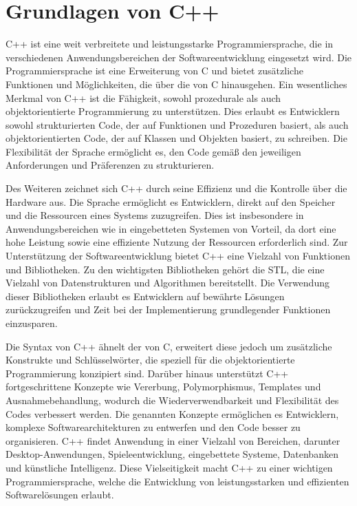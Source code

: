 \section{Grundlagen von C++}

C++ ist eine weit verbreitete und leistungsstarke Programmiersprache, die in verschiedenen Anwendungsbereichen der Softwareentwicklung eingesetzt wird. 
Die Programmiersprache ist eine Erweiterung von C und bietet zusätzliche Funktionen und Möglichkeiten, die über die von C hinausgehen.
Ein wesentliches Merkmal von C++ ist die Fähigkeit, sowohl prozedurale als auch objektorientierte Programmierung zu unterstützen. Dies erlaubt es Entwicklern
sowohl strukturierten Code, der auf Funktionen und Prozeduren basiert, als auch objektorientierten Code, der auf Klassen und Objekten basiert, zu schreiben. 
Die Flexibilität der Sprache ermöglicht es, den Code gemäß den jeweiligen Anforderungen und Präferenzen zu strukturieren.

Des Weiteren zeichnet sich C++ durch seine Effizienz und die Kontrolle über die Hardware aus. Die Sprache ermöglicht es Entwicklern, direkt auf den Speicher und 
die Ressourcen eines Systems zuzugreifen. Dies ist insbesondere in Anwendungsbereichen wie in eingebetteten Systemen von 
Vorteil, da dort eine hohe Leistung sowie eine effiziente Nutzung der Ressourcen erforderlich sind.
Zur Unterstützung der Softwareentwicklung bietet C++ eine Vielzahl von Funktionen und Bibliotheken. Zu den wichtigsten Bibliotheken gehört
die \ac{STL}, die eine Vielzahl von Datenstrukturen und Algorithmen bereitstellt. Die Verwendung dieser Bibliotheken erlaubt es Entwicklern auf 
bewährte Lösungen zurückzugreifen und Zeit bei der Implementierung grundlegender Funktionen einzusparen.

Die Syntax von C++ ähnelt der von C, erweitert diese jedoch um zusätzliche Konstrukte und Schlüsselwörter, die speziell für die objektorientierte Programmierung 
konzipiert sind. Darüber hinaus unterstützt C++ fortgeschrittene Konzepte wie Vererbung, Polymorphismus, Templates und Ausnahmebehandlung, wodurch die Wiederverwendbarkeit 
und Flexibilität des Codes verbessert werden. Die genannten Konzepte ermöglichen es Entwicklern, komplexe Softwarearchitekturen zu entwerfen und den Code besser zu organisieren.
C++ findet Anwendung in einer Vielzahl von Bereichen, darunter Desktop-Anwendungen, Spieleentwicklung, eingebettete Systeme, Datenbanken und künstliche Intelligenz. 
Diese Vielseitigkeit macht C++ zu einer wichtigen Programmiersprache, welche die Entwicklung von leistungsstarken und effizienten Softwarelösungen erlaubt.

\citep{Stroustrup2015}